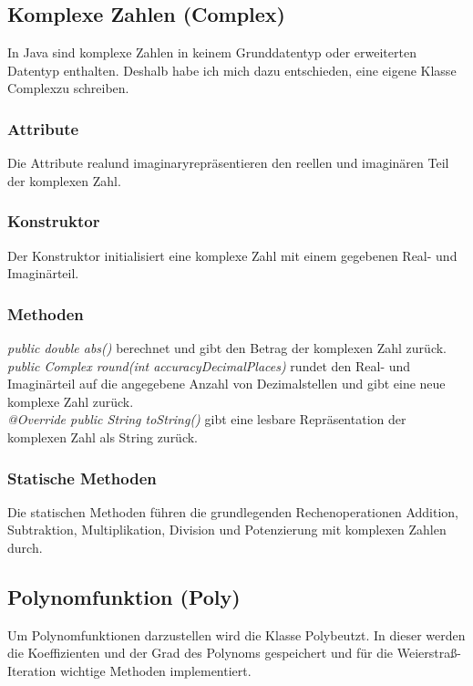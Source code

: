 \documentclass[12pt]{article}
\begin{document}
\subsection{Komplexe Zahlen (Complex)}
In Java sind komplexe Zahlen in keinem Grunddatentyp oder erweiterten Datentyp enthalten. Deshalb habe ich mich dazu entschieden, eine eigene Klasse \glqq Complex\grqq\space zu schreiben.

\subsubsection*{Attribute}
Die Attribute \glqq real\grqq\space und \glqq imaginary\grqq\space repräsentieren den reellen und imaginären Teil der komplexen Zahl.

\subsubsection*{Konstruktor}
Der Konstruktor initialisiert eine komplexe Zahl mit einem gegebenen Real- und Imaginärteil.

\subsubsection*{Methoden}
\textit{public double abs()} berechnet und gibt den Betrag der komplexen Zahl zurück.\\
\textit{public Complex round(int accuracyDecimalPlaces)} rundet den Real- und Imaginärteil auf die angegebene Anzahl von Dezimalstellen und gibt eine neue komplexe Zahl zurück.\\
\textit{@Override public String toString()} gibt eine lesbare Repräsentation der komplexen Zahl als String zurück.

\subsubsection*{Statische Methoden}
Die statischen Methoden führen die grundlegenden Rechenoperationen Addition, Subtraktion, Multiplikation, Division und Potenzierung mit komplexen Zahlen durch.

\subsection{Polynomfunktion (Poly)}
Um Polynomfunktionen darzustellen wird die Klasse \glqq Poly\grqq\space beutzt. In dieser werden die Koeffizienten und der Grad des Polynoms gespeichert und für die Weierstraß-Iteration wichtige Methoden implementiert.
\end{document}
